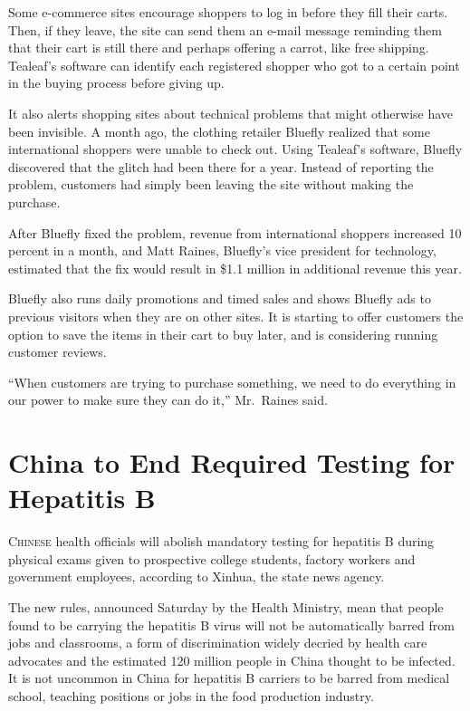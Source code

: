 ﻿\documentclass[12pt]{article}
\begin{document}
Some e-commerce sites encourage shoppers to log in before they fill their carts. Then, if they
leave, the site can send them an e-mail message reminding them that their cart is still there and
perhaps offering a carrot, like free shipping. Tealeaf's software can identify each registered
shopper who got to a certain point in the buying process before giving up.

It also alerts shopping sites about technical problems that might otherwise have been invisible. A
month ago, the clothing retailer Bluefly realized that some international shoppers were unable to
check out. Using Tealeaf's software, Bluefly discovered that the glitch had been there for a year.
Instead of reporting the problem, customers had simply been leaving the site without making the
purchase.

After Bluefly fixed the problem, revenue from international shoppers increased 10 percent in a
month, and Matt Raines, Bluefly's vice president for technology, estimated that the fix would result
in \$1.1 million in additional revenue this year.

Bluefly also runs daily promotions and timed sales and shows Bluefly ads to previous visitors when
they are on other sites. It is starting to offer customers the option to save the items in their
cart to buy later, and is considering running customer reviews.

``When customers are trying to purchase something, we need to do everything in our power to make
sure they can do it,'' Mr.~Raines said.

\section{China to End Required Testing for Hepatitis B}

\lettrine{C}{hinese} health officials will abolish mandatory testing for
hepatitis B during physical exams given to prospective college students, factory workers and
government employees, according to Xinhua, the state news agency.

The new rules, announced Saturday by the Health Ministry, mean that people found to be carrying the
hepatitis B virus will not be automatically barred from jobs and classrooms, a form of
discrimination widely decried by health care advocates and the estimated 120 million people in China
thought to be infected. It is not uncommon in China for hepatitis B carriers to be barred from
medical school, teaching positions or jobs in the food production industry.
\end{document}
